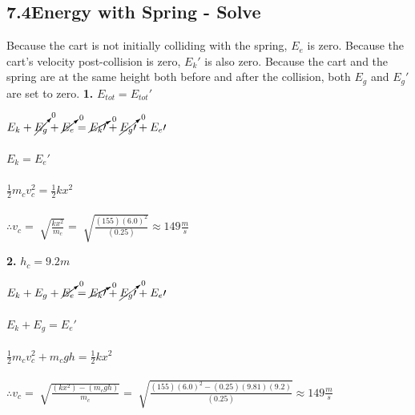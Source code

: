 \subsection*{7.4\hspace*{0.5cm}Energy with Spring - Solve}
Because the cart is not initially colliding with the spring, $E_{e}$ is zero. Because the cart's velocity post-collision is zero, $E_{k}\prime$ is also zero. Because the cart and the spring are at the same height both before and after the collision, both $E_{g}$ and $E_{g}\prime$ are set to zero.\newline\newline
\textbf{1.} $E_{tot} = E_{tot}\prime$ \\
\begin{adjustwidth}{0.6cm}{0pt}
    $E_{k} + \cancelto{0}{E_{g}} + \cancelto{0}{E_{e}} = \cancelto{0}{E_{k}\prime} + \cancelto{0}{E_{g}\prime} + E_{e}\prime$ \\\\
    $E_{k} = E_{e}\prime$ \\\\
    $\frac{1}{2}m_{c}v_{c}^2 = \frac{1}{2}kx^2$ \\\\
    $\therefore v_{c} = \sqrt[]{\frac{kx^2}{m_{c}}} = \sqrt[]{\frac{(155){(6.0)}^2}{(0.25)}} \approx 149\frac{m}{s}$
\end{adjustwidth}\vspace*{15pt}
\textbf{2.} $h_{c} = 9.2m$ \\
\begin{adjustwidth}{0.6cm}{0pt}
    $E_{k} + E_{g} + \cancelto{0}{E_{e}} = \cancelto{0}{E_{k}\prime} + \cancelto{0}{E_{g}\prime} + E_{e}\prime$ \\\\
    $E_{k} + E_{g} = E_{e}\prime$ \\\\
    $\frac{1}{2}m_{c}v_{c}^2 + m_{c}gh = \frac{1}{2}kx^2$ \\\\
    $\therefore v_{c} = \sqrt[]{\frac{(kx^2) - (m_{c}gh)}{m_{c}}} = \sqrt[]{\frac{(155){(6.0)}^2 - (0.25)(9.81)(9.2)}{(0.25)}} \approx 149\frac{m}{s}$
\end{adjustwidth}\vspace*{15pt}